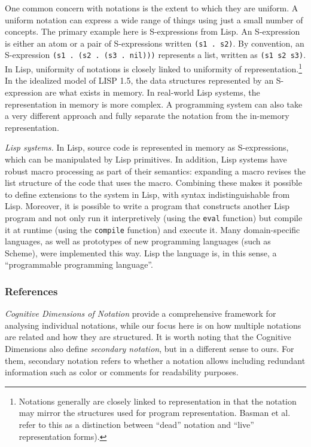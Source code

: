 \documentclass[english,submission]{programming}
\begin{document}
One common concern with notations is the extent to which they are
uniform. A uniform notation can express a wide range of things using
just a small number of concepts. The primary example here is
S-expressions from Lisp. An S-expression is either an atom or a pair of
S-expressions written \texttt{(s1\ .\ s2)}. By convention, an
S-expression \texttt{(s1\ .\ (s2\ .\ (s3\ .\ nil)))} represents a list,
written as \texttt{(s1\ s2\ s3)}. In Lisp, uniformity of notations is
closely linked to uniformity of representation.\footnote{Notations
  generally are closely linked to representation in that the notation
  may mirror the structures used for program representation. Basman et
  al.~\cite{Externalize} refer to this as a distinction between ``dead''
  notation and ``live'' representation forms).} In the idealized model
of LISP 1.5, the data structures represented by an S-expression are what
exists in memory. In real-world Lisp systems, the representation in
memory is more complex. A programming system can also take a very
different approach and fully separate the notation from the in-memory
representation.

\emph{Lisp systems.} In Lisp, source code is represented in memory as
S-expressions, which can be manipulated by Lisp primitives. In addition,
Lisp systems have robust macro processing as part of their semantics:
expanding a macro revises the list structure of the code that uses the
macro. Combining these makes it possible to define extensions to the
system in Lisp, with syntax indistinguishable from Lisp. Moreover, it is
possible to write a program that constructs another Lisp program and not
only run it interpretively (using the \texttt{eval} function) but
compile it at runtime (using the \texttt{compile} function) and execute
it. Many domain-specific languages, as well as prototypes of new
programming languages (such as Scheme), were implemented this way. Lisp
the language is, in this sense, a ``programmable programming language''.
\cite{LispIntro,ProgProgLang}

\hypertarget{references}{%
\subsubsection{References}\label{references}}

\emph{Cognitive Dimensions of Notation} \cite{CogDims} provide a
comprehensive framework for analysing individual notations, while our
focus here is on how multiple notations are related and how they are
structured. It is worth noting that the Cognitive Dimensions also define
\emph{secondary notation}, but in a different sense to ours. For them,
secondary notation refers to whether a notation allows including
redundant information such as color or comments for readability
purposes.
\end{document}
